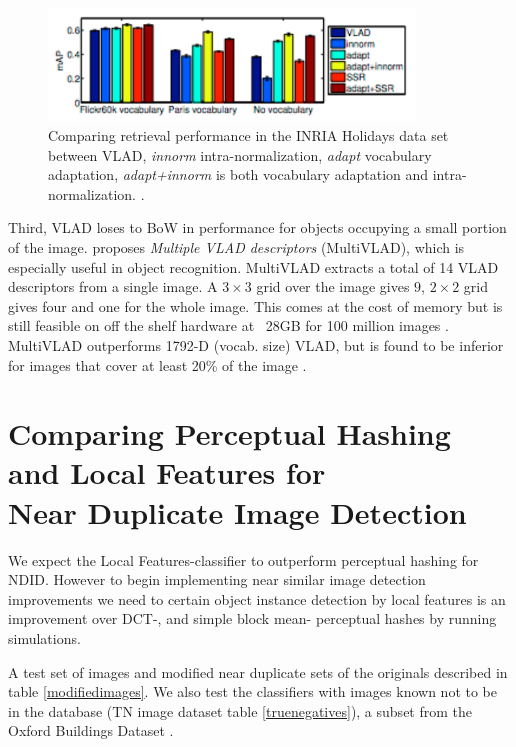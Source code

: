 \documentclass[english,12pt,a4paper,pdftex,elec,utf8]{aaltothesis}
\begin{document}
\begin{figure}[htb]
\begin{center}
\includegraphics[height=3cm]{figures/vladadapt}
\end{center}
\caption{Comparing retrieval performance in the INRIA Holidays data set between VLAD, \emph{innorm} intra-normalization, \emph{adapt} vocabulary adaptation, \emph{adapt+innorm} is both vocabulary adaptation and intra-normalization. \cite{Arandjelovic2013}.}
\label{vladadapt}
\end{figure}

Third, VLAD loses to BoW in performance for objects occupying a small portion of the image. \cite{Arandjelovic2013} proposes \emph{Multiple VLAD descriptors} (MultiVLAD), which is especially useful in object recognition. MultiVLAD extracts a total of 14 VLAD descriptors from a single image. A $3 \times 3$ grid over the image gives $9$, $2 \times 2$ grid gives four and one for the whole image. This comes at the cost of memory but is still feasible on off the shelf hardware at ~28GB for 100 million images \cite{Arandjelovic2013}. MultiVLAD outperforms 1792-D (vocab. size) VLAD, but is found to be inferior for images that cover at least 20\% of the image \cite{Arandjelovic2013}.

\clearpage

\section{Comparing Perceptual Hashing and Local Features for \\Near Duplicate Image Detection} \label{mame}
We expect the Local Features-classifier to outperform perceptual hashing for NDID. However to begin implementing near similar image detection improvements we need to certain object instance detection by local features is an improvement over DCT-, and simple block mean- perceptual hashes by running simulations.

A test set of images and modified near duplicate sets of the originals described in table \ref{modifiedimages}. We also test the classifiers with images known not to be in the database (TN image dataset table \ref{truenegatives}), a subset from the Oxford Buildings Dataset \cite{PhilbinJamesArandjelovicReljaZisserman2012}.
\end{document}
